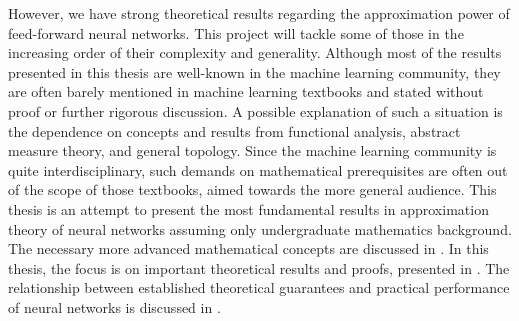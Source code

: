 However, we have strong theoretical results regarding the approximation power of feed-forward neural networks. This project will tackle some of those in the increasing order of their complexity and generality. Although most of the results presented in this thesis are well-known in the machine learning community, they are often barely mentioned in machine learning textbooks and stated without proof or further rigorous discussion. A possible explanation of such a situation is the dependence on concepts and results from functional analysis, abstract measure theory, and general topology. Since the machine learning community is quite interdisciplinary, such demands on mathematical prerequisites are often out of the scope of those textbooks, aimed towards the more general audience. This thesis is an attempt to present the most fundamental results in approximation theory of neural networks assuming only undergraduate mathematics background. The necessary more advanced mathematical concepts are discussed in . In this thesis, the focus is on important theoretical results and proofs, presented in . The relationship between established theoretical guarantees and practical performance of neural networks is discussed in .